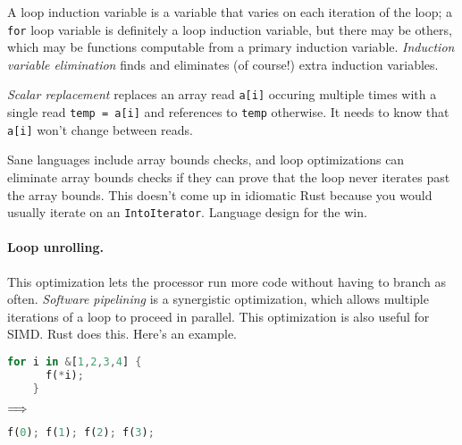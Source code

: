 A loop induction variable is a variable that varies on each iteration
of the loop; a \texttt{for} loop variable is definitely a loop induction variable,
but there may be others, which may be functions computable from a primary induction variable. \emph{Induction variable elimination} finds and eliminates (of course!) extra induction variables.

\emph{Scalar replacement} replaces an array read {\tt a[i]}
occuring multiple times with a single read {\tt temp = a[i]} and references
to {\tt temp} otherwise. It needs to know that {\tt a[i]} won't change
between reads.

Sane languages include array bounds checks, and loop optimizations
can eliminate array bounds checks if they can prove that the loop
never iterates past the array bounds. This doesn't come up in
idiomatic Rust because you would usually iterate on an
\texttt{IntoIterator}. Language design for the win.

\paragraph{Loop unrolling.} This optimization
lets the processor run more code without having to branch
as often. \emph{Software pipelining} is a synergistic optimization,
which allows multiple iterations of a loop to proceed in parallel.
This optimization is also useful for SIMD. Rust does this. Here's an example.
\begin{center}
\vspace*{-1em}
\begin{minipage}{.3\textwidth}
  \begin{lstlisting}[language=Rust]
    for i in &[1,2,3,4] {
      f(*i);
    }
  \end{lstlisting}
  \end{minipage} $\Longrightarrow \hspace*{2em}$ \begin{minipage}{.4\textwidth}
  \begin{lstlisting}[language=Rust]
f(0); f(1); f(2); f(3);
  \end{lstlisting}
  \end{minipage}
  \end{center}

